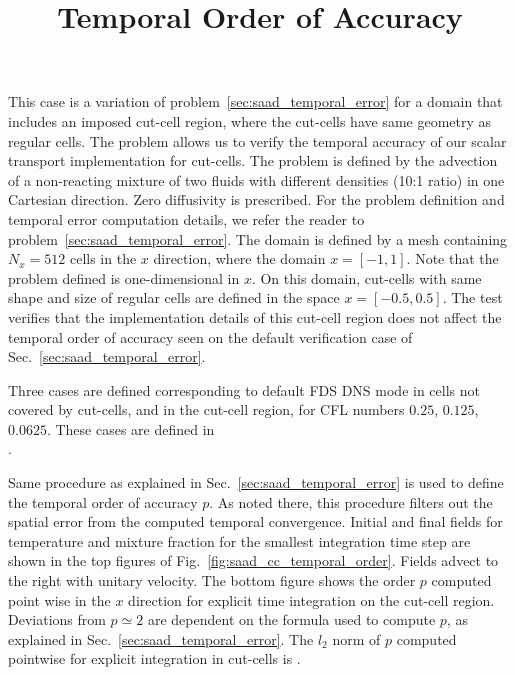 \documentclass[11pt]{book}
\begin{document}
\label{sec:saad_cc_temporal_error}

This case is a variation of problem~\ref{sec:saad_temporal_error} for a domain that includes an imposed cut-cell region, where the cut-cells have same geometry as regular cells. The problem allows us to verify the temporal accuracy of our scalar transport implementation for cut-cells. The problem is defined by the advection of a non-reacting mixture of two fluids with different densities (10:1 ratio) in one Cartesian direction. Zero diffusivity is prescribed. For the problem definition and temporal error computation details, we refer the reader to problem~\ref{sec:saad_temporal_error}.
The domain is defined by a mesh containing $N_x=512$ cells in the $x$ direction, where the domain $x=[-1,1]$. Note that the problem defined is one-dimensional in $x$.
On this domain, cut-cells with same shape and size of regular cells are defined in the space $x=[-0.5,0.5]$. The test verifies that the implementation details of this cut-cell region does not affect the temporal order of accuracy seen on the default verification case of Sec.~\ref{sec:saad_temporal_error}.

\title{Temporal Order of Accuracy}

Three cases are defined corresponding to default FDS DNS mode in cells not covered by cut-cells, and in the cut-cell region, for CFL numbers $0.25$, $0.125$, $0.0625$. These cases are defined in \\ .

Same procedure as explained in Sec.~\ref{sec:saad_temporal_error} is used to define the temporal order of accuracy $p$. As noted there, this procedure filters out the spatial error from the computed temporal convergence. Initial and final fields for temperature and mixture fraction for the smallest integration time step are shown in the top figures of Fig.~\ref{fig:saad_cc_temporal_order}. Fields advect to the right with unitary velocity. The bottom figure shows the order $p$ computed point wise in the $x$ direction for explicit time integration on the cut-cell region. Deviations from $p \simeq 2$ are dependent on the formula used to compute $p$, as explained in Sec.~\ref{sec:saad_temporal_error}.
The $l_2$ norm of $p$ computed pointwise for explicit integration in cut-cells is \!.
\end{document}
